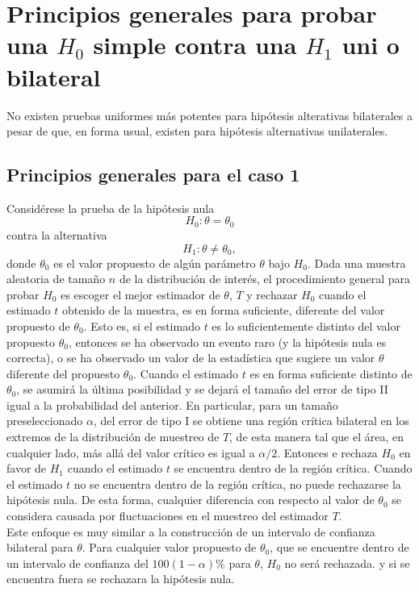 \section{Principios generales para probar una \boldmath $H_0$ simple contra una $H_1$ uni o bilateral}

No existen pruebas uniformes más potentes para hipótesis alterativas bilaterales a pesar de que, en forma usual, existen para hipótesis alternativas unilaterales. 

\subsection{Principios generales para el caso 1}
Considérese la prueba de la hipótesis nula
$$H_0:\theta=\theta_0$$
contra la alternativa
$$H_1:\theta\neq \theta_0,$$
donde $\theta_0$ es el valor propuesto de algún parámetro $\theta$ bajo $H_0$. Dada una muestra aleatoria de tamaño $n$ de la distribución de interés, el procedimiento general para probar $H_0$ es escoger el mejor estimador de $\theta$, $T$ y rechazar $H_0$ cuando el estimado $t$ obtenido de la muestra, es en forma suficiente, diferente del valor propuesto de $\theta_0$. Esto es, si el estimado $t$ es lo suficientemente distinto del valor propuesto $\theta_0$, entonces se ha observado un evento raro (y la hipótesis nula es correcta), o se ha observado un valor de la estadística que sugiere un valor $\theta$ diferente del propuesto $\theta_0$. Cuando el estimado $t$ es en forma suficiente distinto de $\theta_0$, se asumirá la última posibilidad y se dejará el tamaño del error de tipo II igual a la probabilidad del anterior. En particular, para un tamaño preseleccionado $\alpha$, del error de tipo I se obtiene una región crítica bilateral en los extremos de la distribución de muestreo de $T$, de esta manera tal que el área, en cualquier lado, más allá del valor crítico es igual a $\alpha/2$. Entonces e rechaza $H_0$ en favor de $H_1$ cuando el estimado $t$ se encuentra dentro de la región crítica. Cuando el estimado $t$ no se encuentra dentro de la región crítica, no puede rechazarse la hipótesis nula. De esta forma, cualquier diferencia con respecto al valor de $\theta_0$ se considera causada por fluctuaciones en el muestreo del estimador $T$.\\
Este enfoque es muy similar a la construcción de un intervalo de confianza bilateral para $\theta$. Para cualquier valor propuesto de $\theta_0$, que se encuentre dentro de un intervalo de confianza del $100(1-\alpha)\%$ para $\theta$, $H_0$ no será rechazada. y si se encuentra fuera se rechazara la hipótesis nula. 

